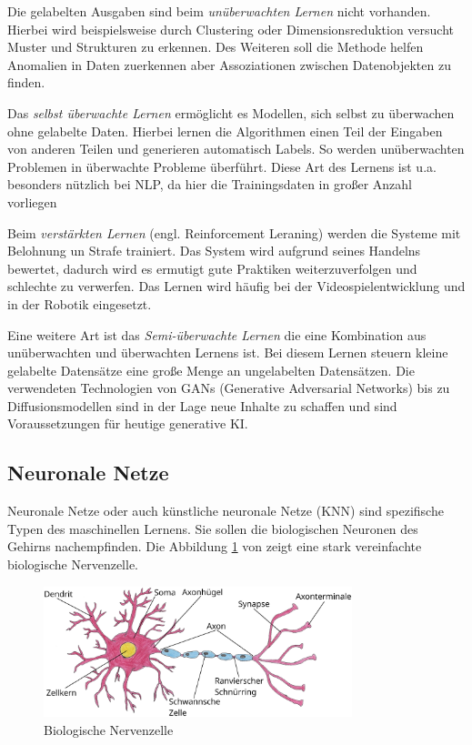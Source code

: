 Die gelabelten Ausgaben sind beim \textit{unüberwachten Lernen} nicht vorhanden. Hierbei wird beispielsweise durch Clustering oder Dimensionsreduktion versucht Muster und Strukturen zu erkennen. Des Weiteren soll die Methode helfen Anomalien in Daten zuerkennen aber Assoziationen zwischen Datenobjekten zu finden.\vspace{0.2cm}

Das \textit{selbst überwachte Lernen} ermöglicht es Modellen, sich selbst zu überwachen ohne gelabelte Daten. Hierbei lernen die Algorithmen einen Teil der Eingaben von anderen Teilen und generieren automatisch Labels. So werden unüberwachten Problemen in überwachte Probleme überführt. Diese Art des Lernens ist u.a. besonders nützlich bei NLP, da hier die Trainingsdaten in großer Anzahl vorliegen\vspace{0.2cm}

Beim \textit{verstärkten Lernen} (engl. Reinforcement Leraning) werden die Systeme mit Belohnung un Strafe trainiert. Das System wird aufgrund seines Handelns bewertet, dadurch wird es ermutigt gute Praktiken weiterzuverfolgen und schlechte zu verwerfen. Das Lernen wird häufig bei der Videospielentwicklung und in der Robotik eingesetzt.\vspace{0.2cm}

Eine weitere Art ist das \textit{Semi-überwachte Lernen} die eine Kombination aus unüberwachten und überwachten Lernens ist. Bei diesem Lernen steuern kleine gelabelte Datensätze eine große Menge an ungelabelten Datensätzen. Die verwendeten Technologien von GANs (Generative Adversarial Networks) bis zu Diffusionsmodellen sind in der Lage neue Inhalte zu schaffen und sind Voraussetzungen für heutige generative KI.\vspace{0.2cm}


\subsection{Neuronale Netze}
Neuronale Netze oder auch künstliche neuronale Netze (\acrshort{KNN}) sind spezifische Typen des maschinellen Lernens. Sie sollen die biologischen Neuronen des Gehirns nachempfinden. Die Abbildung \ref{img:biological_neuron} von \cite{pahl-2024} zeigt eine stark vereinfachte biologische Nervenzelle.

\begin{figure}[!ht]
	\includegraphics[width=0.8\textwidth]{content/chapter_basics/images/biological_neuron.eps}
	\centering
	\caption{Biologische Nervenzelle}
	\label{img:biological_neuron}
\end{figure}

